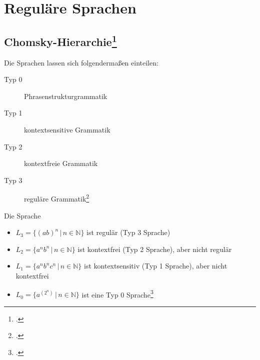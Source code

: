 \documentclass{lehramt-informatik-haupt}
\begin{document}

\chapter{Reguläre Sprachen}

\section{Chomsky-Hierarchie\footcite{wiki:chomsky}}

Die Sprachen lassen sich folgendermaßen einteilen:

\begin{description}
\item[Typ 0] Phrasenstrukturgrammatik
\item[Typ 1] kontextsensitive Grammatik
\item[Typ 2] kontextfreie Grammatik
\item[Typ 3] reguläre Grammatik\footcite[Seite 14]{theoinf:fs:1}
\end{description}


%

\noindent
Die Sprache

\begin{itemize}
\item $L_3 = \{(ab)^n \, | \, n \in \mathbb{N}\}$
ist regulär (Typ 3 Sprache)

\item $L_2 = \{a^n b^n \, | \, n \in \mathbb{N}\}$
ist kontextfrei (Typ 2 Sprache), aber nicht regulär

\item $L_1 = \{a^n b^n c^n \, | \, n \in \mathbb{N}\}$
ist kontextsensitiv (Typ 1 Sprache), aber nicht kontextfrei

\item $L_0 = \{a^{(2^n)}\, | \, n \in \mathbb{N}\}$
ist eine Typ 0 Sprache\footcite[Seite 15]{theoinf:fs:1}
\end{itemize}
\end{document}
